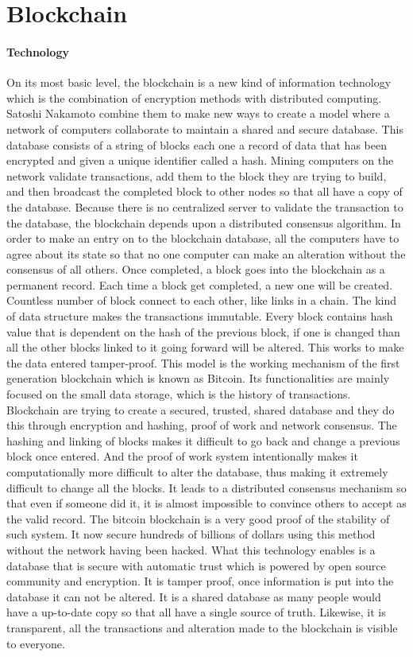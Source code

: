 \documentclass [11pt]{report}
\begin{document}
\section{Blockchain}
\paragraph{Technology}
On its most basic level, 
the blockchain is a new kind of information technology 
which is the combination of encryption methods with distributed computing.
Satoshi Nakamoto \cite{nakamoto2008bitcoin} combine them to make new ways to create a model 
where a network of computers collaborate to maintain a shared and secure database. 
This database consists of a string of blocks each one a record of data 
that has been encrypted and given a unique identifier called a hash.
Mining computers on the network validate transactions, 
add them to the block they are trying to build, 
and then broadcast the completed block to other nodes 
so that all have a copy of the database. 
Because there is no centralized server to validate the transaction to the database,
the blockchain depends upon a distributed consensus algorithm. 
In order to make an entry on to the blockchain database, 
all the computers have to agree about its state 
so that no one computer can make an alteration without the consensus of all others.
Once completed, a block goes into the blockchain as a permanent record. Each time a block get completed, a new one will be created.
Countless number of block connect to each other, like links in a chain. The kind of data structure makes the transactions immutable.
Every block contains hash value that is dependent on the hash of the previous block, 
if one is changed than all the other blocks linked to it going forward will be altered.
This works to make the data entered tamper-proof. 
This model is the working mechanism of the first generation blockchain which is known as Bitcoin.
Its functionalities are mainly focused on the small data storage, which is the history of transactions.
Blockchain are trying to create a secured, trusted, 
shared database and they do this through encryption and hashing,
proof of work and network consensus. The hashing and linking of blocks 
makes it difficult to go back and change a previous block once entered. 
And the proof of work system intentionally makes it computationally more difficult to alter the database,
thus making it extremely difficult to change all the blocks. It leads to a distributed consensus mechanism so that even if someone did it,
it is almost impossible to convince others to accept as the valid record. The bitcoin blockchain is a very good proof of the stability of such system.
It now secure hundreds of billions of dollars using this method without the network having been hacked. 
What this technology enables is a database that is secure with automatic trust 
which is powered by open source community and encryption.
It is tamper proof, once information is put into the database it can not be altered. 
It is a shared database as many people would have a up-to-date copy so that all have a single source of truth.
Likewise, it is transparent, all the transactions and alteration made to the blockchain is visible to everyone.
\end{document}
